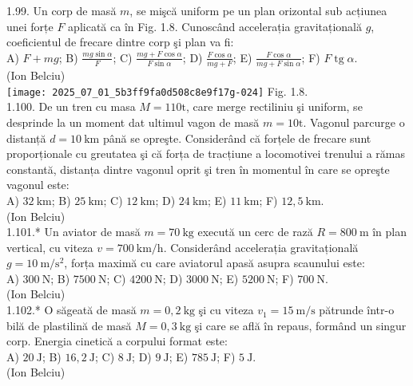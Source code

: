 1.99. Un corp de masă $m$, se mişcă uniform pe un plan orizontal sub acțiunea unei forțe $F$ aplicată ca în Fig. 1.8. Cunoscând accelerația gravitațională $g$, coeficientul de frecare dintre corp şi plan va fi:\\ A) $F+m g$; B) $\frac{m g \sin \alpha}{F}$; C) $\frac{m g+F \cos \alpha}{F \sin \alpha}$; D) $\frac{F \cos \alpha}{m g+F}$; E) $\frac{F \cos \alpha}{m g+F \sin \alpha}$; F) $F \operatorname{tg} \alpha$.\\ (Ion Belciu)\\ \texttt{[image: 2025\_07\_01\_5b3ff9fa0d508c8e9f17g-024]} Fig. 1.8.\\

1.100. De un tren cu masa $M=110 \mathrm{t}$, care merge rectiliniu şi uniform, se desprinde la un moment dat ultimul vagon de masă $m=10 \mathrm{t}$. Vagonul parcurge o distanță $d=10 \mathrm{~km}$ până se opreşte. Considerând că forțele de frecare sunt proporționale cu greutatea şi că forța de tracțiune a locomotivei trenului a rămas constantă, distanța dintre vagonul oprit şi tren în momentul în care se opreşte vagonul este:\\ A) $32 \mathrm{~km}$; B) $25 \mathrm{~km}$; C) $12 \mathrm{~km}$; D) $24 \mathrm{~km}$; E) $11 \mathrm{~km}$; F) $12,5 \mathrm{~km}$.\\ (Ion Belciu)\\

1.101.* Un aviator de masă $m=70 \mathrm{~kg}$ execută un cerc de rază $R=800 \mathrm{~m}$ în plan vertical, cu viteza $v=700 \mathrm{~km} / \mathrm{h}$. Considerând accelerația gravitațională $g=10 \mathrm{~m} / \mathrm{s}^{2}$, forța maximă cu care aviatorul apasă asupra scaunului este:\\ A) $300 \mathrm{~N}$; B) $7500 \mathrm{~N}$; C) $4200 \mathrm{~N}$; D) $3000 \mathrm{~N}$; E) $5200 \mathrm{~N}$; F) $700 \mathrm{~N}$.\\ (Ion Belciu)\\

1.102.* O săgeată de masă $m=0,2 \mathrm{~kg}$ şi cu viteza $v_{1}=15 \mathrm{~m} / \mathrm{s}$ pătrunde într-o bilă de plastilină de masă $M=0,3 \mathrm{~kg}$ şi care se află în repaus, formând un singur corp. Energia cinetică a corpului format este:\\ A) $20 \mathrm{~J}$; B) $16,2 \mathrm{~J}$; C) $8 \mathrm{~J}$; D) $9 \mathrm{~J}$; E) $785 \mathrm{~J}$; F) $5 \mathrm{~J}$.\\ (Ion Belciu)\\

